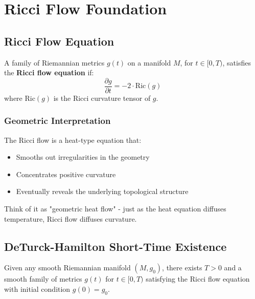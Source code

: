 \chapter{Ricci Flow Foundation}
\label{chap:ricci_flow_foundation}

\section{Ricci Flow Equation}

\begin{definition}
\label{def:ricci_flow}
\leanok
A family of Riemannian metrics $g(t)$ on a manifold $M$, for $t \in [0,T)$, satisfies the \textbf{Ricci flow equation} if:
\[
\frac{\partial g}{\partial t} = -2 \cdot \text{Ric}(g)
\]
where $\text{Ric}(g)$ is the Ricci curvature tensor of $g$.
\end{definition}

\subsection{Geometric Interpretation}

The Ricci flow is a heat-type equation that:
\begin{itemize}
\item Smooths out irregularities in the geometry
\item Concentrates positive curvature
\item Eventually reveals the underlying topological structure
\end{itemize}

Think of it as "geometric heat flow" - just as the heat equation diffuses temperature, Ricci flow diffuses curvature.

\section{DeTurck-Hamilton Short-Time Existence}

\begin{theorem}
\label{thm:deturck_existence}
\leanok
{}
Given any smooth Riemannian manifold $(M, g_0)$, there exists $T > 0$ and a smooth family of metrics $g(t)$ for $t \in [0, T)$ satisfying the Ricci flow equation with initial condition $g(0) = g_0$.
\end{theorem}

